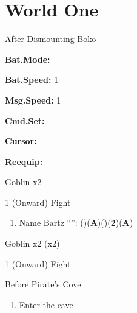 \newpage

\chapter{World One}

\vspace{\baselineskip}

\begin{paracol}{2}

\begin{menu}{After Dismounting Boko}
	\varwb
	\begin{configMenu}
		\item {} \textbf{Bat.Mode:} \activeOption
		\item {} \textbf{Bat.Speed:} 1
		\item {} \textbf{Msg.Speed:} 1
		\item {} \textbf{Cmd.Set:} \shortOption
		\item {} \textbf{Cursor:} \memoryOption
		\item {} \textbf{Reequip:} \emptyOption
	\end{configMenu}
	\varwe
\end{menu}

\begin{encounter}{Goblin x2}
	\varwb
	\begin{round}{1 (Onward)}
		\bartz Fight
	\end{round}
	\varwe
\end{encounter}

\begin{enumerate}
	\item Name Bartz  “”: (\pointDown)(\textbf{A})(\pointUp)(\textbf{2}\pointRight)(\textbf{A})
\end{enumerate}

\begin{encounter}{Goblin x2 (x2)}
	\varwb
	\begin{round}{1 (Onward)}
		\bartz Fight
	\end{round}
	\varwe
\end{encounter}

\switchcolumn
\begin{steproute}{Before Pirate's Cove}
\end{steproute}

\switchcolumn
\begin{enumerate}[resume]
	\item Enter the cave
\end{enumerate}


\end{paracol}
